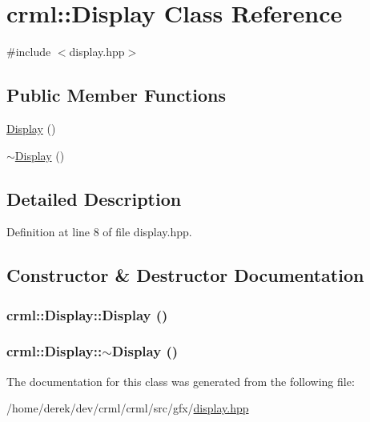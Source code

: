 \hypertarget{classcrml_1_1_display}{
\section{crml::Display Class Reference}
\label{classcrml_1_1_display}
}


{\ttfamily \#include $<$display.hpp$>$}

\subsection*{Public Member Functions}
\begin{DoxyCompactItemize}
\item 
\hyperlink{classcrml_1_1_display_a7ace484d6186f2ea1929a801bb0b926f}{Display} ()
\item 
\hyperlink{classcrml_1_1_display_a0e2d1255255be803ee04e0880ca79bea}{$\sim$Display} ()
\end{DoxyCompactItemize}


\subsection{Detailed Description}


Definition at line 8 of file display.hpp.



\subsection{Constructor \& Destructor Documentation}
\hypertarget{classcrml_1_1_display_a7ace484d6186f2ea1929a801bb0b926f}{
\subsubsection[{Display}]{\setlength{\rightskip}{0pt plus 5cm}crml::Display::Display ()}}
\label{classcrml_1_1_display_a7ace484d6186f2ea1929a801bb0b926f}
\hypertarget{classcrml_1_1_display_a0e2d1255255be803ee04e0880ca79bea}{
\subsubsection[{$\sim$Display}]{\setlength{\rightskip}{0pt plus 5cm}crml::Display::$\sim$Display ()}}
\label{classcrml_1_1_display_a0e2d1255255be803ee04e0880ca79bea}


The documentation for this class was generated from the following file:\begin{DoxyCompactItemize}
\item 
/home/derek/dev/crml/crml/src/gfx/\hyperlink{display_8hpp}{display.hpp}\end{DoxyCompactItemize}
